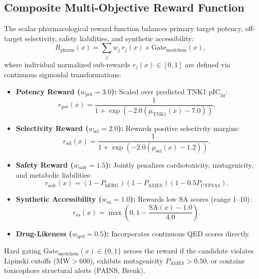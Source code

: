 \documentclass[journal]{IEEEtran}
\begin{document}
\subsection{Composite Multi-Objective Reward Function}
The scalar pharmacological reward function balances primary target potency, off-target selectivity, safety liabilities, and synthetic accessibility:
\begin{equation}
    R_{\text{pharm}}(x) = \sum_{j} w_j \, r_j(x) \times \text{Gate}_{\text{medchem}}(x),
\end{equation}
where individual normalized sub-rewards $r_j(x) \in [0, 1]$ are defined via continuous sigmoidal transformations:
\begin{itemize}
    \item \textbf{Potency Reward ($w_{\text{pot}} = 3.0$):} Scaled over predicted TNK1 $\text{pIC}_{50}$:
    \begin{equation}
        r_{\text{pot}}(x) = \frac{1}{1 + \exp\left(-2.0(\mu_{\text{TNK1}}(x) - 7.0)\right)}.
    \end{equation}
    \item \textbf{Selectivity Reward ($w_{\text{sel}} = 2.0$):} Rewards positive selectivity margins:
    \begin{equation}
        r_{\text{sel}}(x) = \frac{1}{1 + \exp\left(-2.0(\mu_{\text{sel}}(x) - 1.2)\right)}.
    \end{equation}
    \item \textbf{Safety Reward ($w_{\text{safe}} = 1.5$):} Jointly penalizes cardiotoxicity, mutagenicity, and metabolic liabilities:
    \begin{equation}
        r_{\text{safe}}(x) = (1 - P_{\text{hERG}})(1 - P_{\text{AMES}})(1 - 0.5 P_{\text{CYP3A4}}).
    \end{equation}
    \item \textbf{Synthetic Accessibility ($w_{\text{sa}} = 1.0$):} Rewards low SA scores (range 1--10):
    \begin{equation}
        r_{\text{sa}}(x) = \max\left(0, 1 - \frac{\text{SA}(x) - 1.0}{4.0}\right).
    \end{equation}
    \item \textbf{Drug-Likeness ($w_{\text{qed}} = 0.5$):} Incorporates continuous QED scores directly.
\end{itemize}

Hard gating $\text{Gate}_{\text{medchem}}(x) \in \{0, 1\}$ zeroes the reward if the candidate violates Lipinski cutoffs ($\text{MW} > 600$), exhibits mutagenicity $P_{\text{AMES}} > 0.50$, or contains toxicophore structural alerts (PAINS, Brenk).
\end{document}
